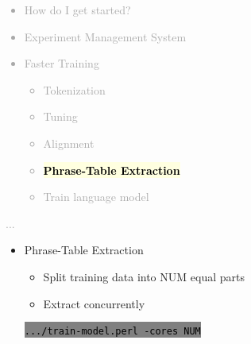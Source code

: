 \documentclass[landscape]{uedslides2C}
\newcommand{\currenttopic}[1]{\colorbox{lightyellow}{\textcolor{black}{\bf #1}}}
\newcommand{\littlecode}[1]{\colorbox{gray}{\textcolor{black}{\small \tt #1}}}
\begin{document}

\vspace{-5mm}
\textcolor{darkgrey}{
\begin{itemize} \itemsep -1mm
\item {How do I get started?}
\item {Experiment Management System}
\item {Faster Training}
  \begin{itemize}
  \item {Tokenization}
  \item {Tuning}
  \item {Alignment}
  \item \currenttopic{Phrase-Table Extraction}
  \item Train language model
  \end{itemize}
\end{itemize}
...
}


\vspace{30mm}
\begin{itemize} \itemsep -1mm

\item {Phrase-Table Extraction}
  \begin{itemize}
  \item Split training data into NUM equal parts
  \item Extract concurrently
  \end{itemize}
  \begin{center}
    \littlecode{.../train-model.perl -cores NUM}
  \end{center}      
\end{itemize}

\end{document}
